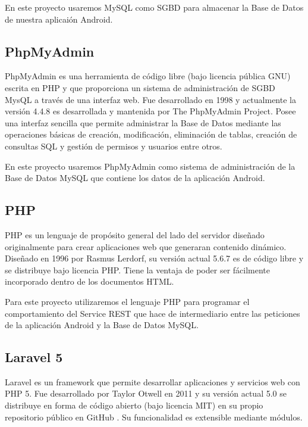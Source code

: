 	En este proyecto usaremos MySQL como SGBD para almacenar la Base de Datos de nuestra aplicaión Android.
    
    \subsection{PhpMyAdmin}\label{ssec:phpmyadmin}
    
	PhpMyAdmin \cite{ref:phpMyAdmin} es una herramienta de código libre (bajo licencia pública GNU) escrita en PHP y que proporciona un sistema de administración de SGBD MysQL a través de una interfaz web. Fue desarrollado en 1998 y actualmente la versión 4.4.8 es desarrollada y mantenida por The PhpMyAdmin Project. Posee una interfaz sencilla que permite administrar la Base de Datos mediante las operaciones básicas de creación, modificación, eliminación de tablas,  creación de consultas SQL y gestión de permisos y usuarios entre otros.
	
	En este proyecto usaremos PhpMyAdmin como sistema de administración de la Base de Datos MySQL que contiene los datos de la aplicación Android.
    
    \subsection{PHP}\label{ssec:php}
    
	PHP \cite{ref:php} es un lenguaje de propósito general del lado del servidor diseñado originalmente para crear aplicaciones web que generaran contenido dinámico. Diseñado en 1996 por Rasmus Lerdorf, su versión actual 5.6.7 es de código libre y se distribuye bajo licencia PHP. Tiene la ventaja de poder ser fácilmente incorporado dentro de los documentos HTML.
	
	Para este proyecto utilizaremos el lenguaje PHP para programar el comportamiento del Service REST que hace de intermediario entre las peticiones de la aplicación Android y la Base de Datos MySQL.
    
    \subsection{Laravel 5}\label{ssec:laravel}
    
	Laravel \cite{ref:laravel} es un framework que permite desarrollar aplicaciones y servicios web con PHP 5. Fue desarrollado por Taylor Otwell en 2011 y su versión actual 5.0 se distribuye en forma de código abierto (bajo licencia MIT) en su propio repositorio público en GitHub \cite{ref:laravel_github}. Su funcionalidad es extensible mediante módulos.
	
